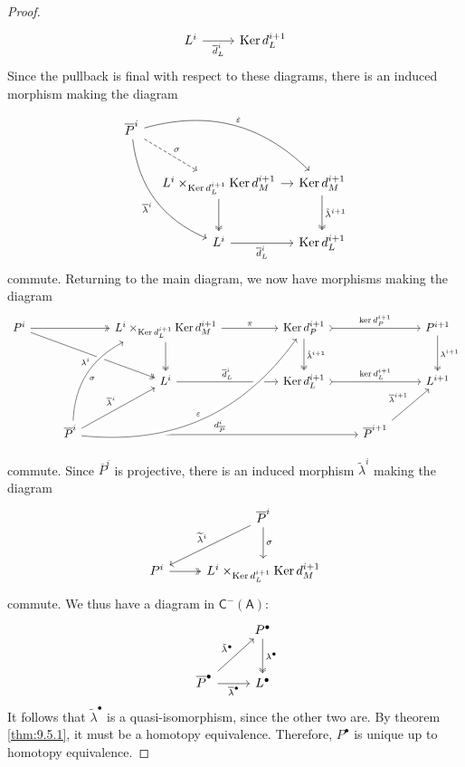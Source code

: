 \begin{proof}
\[\begin{tikzcd}[row sep = 2.5em, column sep = 2.5em]
	L^i\ar[r, " \overline{d} ^{i}_L"']&\Ker d_L^{i+1} 
\end{tikzcd}\]
Since the pullback is final with respect to these diagrams, there is an induced morphism making the diagram
\[\begin{tikzcd}[row sep = 2.5em, column sep = 1em]
	\overline{P} ^i\ar[drr, bend left, "\varepsilon "]\ar[ddr, bend right, " \overline{\lambda } ^i"']\ar[dr, dashed, "\sigma "]\\
	&L^i\times_{\Ker d_L^{i+1} } \Ker d_M^{i+1} \ar[r]\ar[d, two heads]&\Ker d_M^{i+1} \ar[d, "\hat{\lambda }^{i+1} ", two heads]\\
	&L^i\ar[r, " \overline{d} _L^i"']&\Ker d_L^{i+1} 
\end{tikzcd}\]
commute. Returning to the main diagram, we now have morphisms making the diagram
\[\begin{tikzcd}[row sep = 2.5em, column sep = 2.5em]
	P^i	&		 & L^i \times_{\Ker d_L^{i+1} } \Ker d_M^{i+1}	& &
	\Ker d_P^{i+1}	&			& P^{i+1} \\
		&		 & L^i						& &
	\Ker d_L^{i+1}	&			& L^{i+1} \\
		& \overline{P}^i &						& &
			& \overline{P}^{i+1}	& 
			\arrow[from=1-1, to=1-3, two heads]\arrow[from=1-3, to=1-5, "\pi "]\arrow[from=1-5, to=1-7, tail, "\ker d_P^{i+1} "]
			\arrow[from=1-1, to=2-3, two heads, "\lambda^i"']
			\arrow[from=1-3, to=2-3, two heads]
			\arrow[from=1-5, to=2-5, two heads, "\hat{\lambda }^{i+1} "]
			\arrow[from=1-7, to=2-7, two heads, "\lambda^{i+1} "]
			\arrow[from=2-3, to=2-5, " \overline{d}_L^i"]\arrow[from=2-5, to=2-7, tail, "\ker d_L^{i+1} "]
			\arrow[from=3-2, to=2-3, " \overline{\lambda }^i"]\arrow[from=3-2, to=3-6, "d_{\overline{P} }^{i} "]\arrow[from=3-2, to=1-3, crossing over, bend left, "\sigma "']\arrow[from=3-2, to=1-5, crossing over, bend right, "\varepsilon "]
			\arrow[from=3-6, to=2-7, "\overline{\lambda }^{i+1} "]
\end{tikzcd}\]
commute. Since $\overline{P} ^{i} $ is projective, there is an induced morphism $\widetilde{\lambda } ^{i} $ making the diagram
\[\begin{tikzcd}[row sep = 2.5em, column sep = 2.5em]
	&\overline{P} ^{i} \ar[d, "\sigma "]\ar[dl, " \widetilde{\lambda }^i"']\\
	P^i\ar[r, two heads]&L^i\times _{\Ker d_L^{i+1} } \Ker d_M^{i+1} 
\end{tikzcd}\]
commute. We thus have a diagram in $\mathsf{C} ^{-} (\mathsf{A} )$:
\[\begin{tikzcd}[row sep = 2.5em, column sep = 2.5em]
	&P^{\bullet} \ar[d, two heads, "\lambda ^{\bullet} "]\\
	\overline{P}^{\bullet}  \ar[ur, " \tilde{\lambda }^{\bullet} "]\ar[r, " \overline{\lambda }^{\bullet} "']&L^{\bullet}
\end{tikzcd}\]
It follows that $\widetilde{\lambda } ^{\bullet} $ is a quasi-isomorphism, since the other two are. By theorem \ref{thm:9.5.1}, it must be a homotopy equivalence. Therefore, $P^{\bullet} $ is unique up to homotopy equivalence.


\end{proof}
